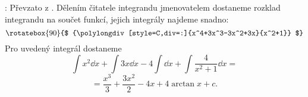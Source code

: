 \begin{mdframed}[style=mdmathsolution]
  [\ref{mai:eq145}]: Převzato z \cite[s.~29]{Knichal}. Dělením čitatele integrandu jmenovatelem
  dostaneme rozklad integrandu na součet funkcí, jejich integrály najdeme snadno:
  \begin{equation*}
    \rotatebox{90}{$
      {\polylongdiv[style=C,div=:]{x^4+3x^3-3x^2+3x}{x^2+1}}
    $}
  \end{equation*}
  Pro uvedený integrál dostaneme
  \begin{equation*}
    \int{x^2}\dd{x} +\int{3x}\dd{x}-4\int\dd{x}+\int{\frac{4}{x^2+1}\dd{x}} = 
  \end{equation*}
  \begin{equation*}
    = \frac{x^3}{3}+\frac{3x^2}{2}-4x+4\arctan x + c.
  \end{equation*}
\end{mdframed}